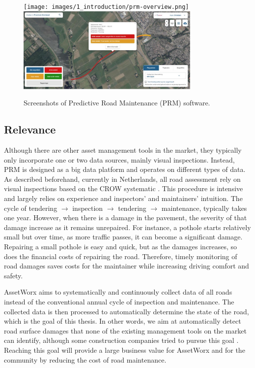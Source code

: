 \begin{figure}[ht]
    \begin{center}
    \texttt{[image: images/1\_introduction/prm-overview.png]}
    \includegraphics[width=0.8\textwidth]{images/1_introduction/prm-detail.png}
    \end{center}
    \caption{Screenshots of Predictive Road Maintenance (PRM) software.}
    \label{fig:prm}
\end{figure}


\subsection{Relevance}
\label{sec:relevance}

Although there are other asset management tools in the market, they typically only incorporate one or two data sources, mainly visual inspections. Instead, PRM is designed as a big data platform and operates on different types of data. As described beforehand, currently in Netherlands, all road assessment rely on visual inspections based on the CROW systematic \cite{CROW_147}. This procedure is intensive and largely relies on experience and inspectors' and maintainers' intuition. The cycle of tendering $\rightarrow$ inspection $\rightarrow$ tendering $\rightarrow$ maintenance, typically takes one year. However, when there is a damage in the pavement, the severity of that damage increase as it remains unrepaired. For instance, a pothole starts relatively small but over time, as more traffic passes, it can become a significant damage. Repairing a small pothole is easy and quick, but as the damages increases, so does the financial costs of repairing the road. Therefore, timely monitoring of road damages saves costs for the maintainer while increasing driving comfort and safety.

AssetWorx aims to systematically and continuously collect data of all roads instead of the conventional annual cycle of inspection and maintenance. The collected data is then processed to automatically determine the state of the road, which is the goal of this thesis. In other words, we aim at automatically detect road surface damages that  none of the existing management tools on the market can identify, although some construction companies tried to pursue this goal \cite{BAM2018}. Reaching this goal will provide a large business value for AssetWorx and for the community by reducing the cost of road maintenance.

